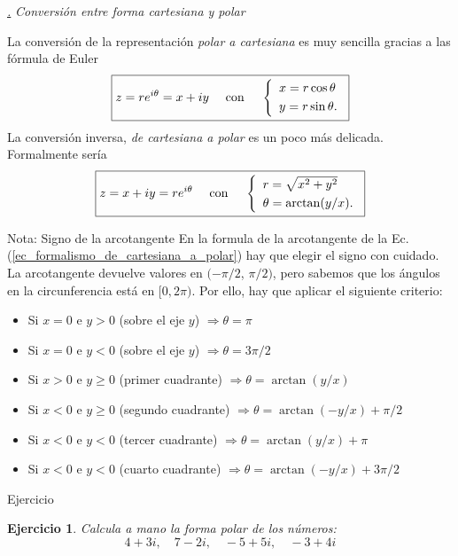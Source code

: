 \documentclass[a4paper,11pt]{book} %
\newtheorem{ejercicio_contador}{Ejercicio}
\newcommand{\Ejercicio}[1]{
		\begin{mybox_gray}{Ejercicio} 
			\begin{ejercicio_contador}
				 #1 
			\end{ejercicio_contador} 
		\end{mybox_gray}
	}
\numberwithin{equation}{chapter}
\def\subsubiContadorIt{\par\addtocounter{subsubsection}{1}\underline{\it\thesubsubsection.}\hskip0.5cm \setcounter{subsubsubsectionIt}{0}}
\newcommand{\SubsubiIt}[1]{
		\subsubiContadorIt \textit{#1}
	}
\newcounter{subsubsubsectionIt}[subsubsection]
\begin{document}
		
			\SubsubiIt{Conversión entre forma cartesiana y polar}

La conversión de la representación \textit{polar a cartesiana} es muy sencilla gracias a las fórmula de Euler
	\begin{equation}
	\boxed{z = r e^{i\theta} = x + i y ~~~\hbox{ con }  ~~~\left\{\begin{array}{l} x=r \cos \theta \\ \rule{0mm}{4mm} y = r\sin \theta . \end{array} \right. }
	\end{equation}
La conversión inversa, \textit{de cartesiana a polar} es un poco más delicada. Formalmente sería
	\begin{equation} \label{ec_formalismo_de_cartesiana_a_polar}
	\boxed{z = x + i y  = r e^{i\theta} ~~~ \hbox{ con } ~~~ \left\{\begin{array}{l} r=\sqrt{x^2+y^2} \\  \rule{0mm}{4mm} \theta = \arctan(y/x) . \end{array} \right.} 
	\end{equation}

	\begin{mybox_blue}{Nota: Signo de la arcotangente}
	En la formula de la arcotangente de la Ec. (\ref{ec_formalismo_de_cartesiana_a_polar}) hay que elegir el signo con cuidado. La arcotangente devuelve valores en $(-\pi/2$, $\pi/2)$, pero sabemos que los ángulos en la circunferencia está en  $[0,2\pi)$. Por ello, hay que aplicar el siguiente criterio:
	\begin{itemize}
		\item Si $x=0$ e $y>0$ (sobre el eje $y$) $\Rightarrow \theta = \pi$
		\item Si $x=0$ e $y<0$ (sobre el eje $y$) $ \Rightarrow \theta = 3\pi/2$
		\item Si $x>0$ e $y \geq 0$ (primer cuadrante) $ \Rightarrow \theta = \arctan (y/x)$
		\item Si $x<0$ e $y \geq 0$ (segundo cuadrante) $ \Rightarrow \theta = \arctan (-y/x) + \pi/2$
		\item Si $x<0$ e $y<0$ (tercer cuadrante) $ \Rightarrow \theta = \arctan (y/x) + \pi$
		\item Si $x<0$ e $y<0$ (cuarto cuadrante) $ \Rightarrow \theta = \arctan (-y/x) + 3\pi/2$
	\end{itemize}
	\end{mybox_blue}

	\Ejercicio{
	Calcula a mano la forma polar de los números: 
	$$
	4 + 3i, \quad 7 - 2i, \quad - 5 + 5i, \quad - 3 + 4i
	$$
	}
			
\end{document}
